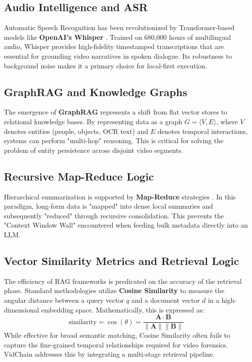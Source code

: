\subsection{Audio Intelligence and ASR}
Automatic Speech Recognition has been revolutionized by Transformer-based models like \textbf{OpenAI's Whisper} \cite{whisper}. Trained on 680,000 hours of multilingual audio, Whisper provides high-fidelity timestamped transcriptions that are essential for grounding video narratives in spoken dialogue. Its robustness to background noise makes it a primary choice for local-first execution.

\subsection{GraphRAG and Knowledge Graphs}
The emergence of \textbf{GraphRAG} \cite{graphrag} represents a shift from flat vector stores to relational knowledge bases. By representing data as a graph $G = \langle V, E \rangle$, where $V$ denotes entities (people, objects, OCR text) and $E$ denotes temporal interactions, systems can perform "multi-hop" reasoning. This is critical for solving the problem of entity persistence across disjoint video segments.

\subsection{Recursive Map-Reduce Logic}
Hierarchical summarization is supported by \textbf{Map-Reduce} strategies \cite{mapreduce}. In this paradigm, long-form data is "mapped" into dense local summaries and subsequently "reduced" through recursive consolidation. This prevents the "Context Window Wall" encountered when feeding bulk metadata directly into an LLM.

\subsection{Vector Similarity Metrics and Retrieval Logic}
The efficiency of RAG frameworks is predicated on the accuracy of the retrieval phase. Standard methodologies utilize \textbf{Cosine Similarity} to measure the angular distance between a query vector $q$ and a document vector $d$ in a high-dimensional embedding space. Mathematically, this is expressed as:
\[ \text{similarity} = \cos(\theta) = \frac{\mathbf{A} \cdot \mathbf{B}}{\|\mathbf{A}\| \|\mathbf{B}\|} \]
While effective for broad semantic matching, Cosine Similarity often fails to capture the fine-grained temporal relationships required for video forensics. VidChain addresses this by integrating a multi-stage retrieval pipeline.

